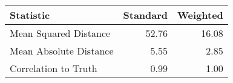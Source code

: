 \begin{tabular}{lrr}
  \hline
Statistic & Standard & Weighted \\ 
  \hline
Mean Squared Distance & 52.76 & 16.08 \\ 
  Mean Absolute Distance & 5.55 & 2.85 \\ 
  Correlation to Truth & 0.99 & 1.00 \\ 
   \hline
\end{tabular}
